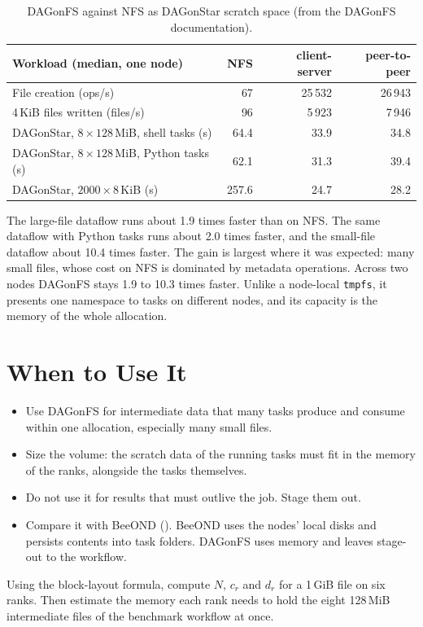 \begin{table}[h]
\centering
\begin{tabular}{@{}lrrr@{}}
\toprule
Workload (median, one node) & NFS & client-server & peer-to-peer \\
\midrule
File creation (ops/s) & 67 & 25\,532 & 26\,943 \\
4\,KiB files written (files/s) & 96 & 5\,923 & 7\,946 \\
DAGonStar, $8\times128$\,MiB, shell tasks (s) & 64.4 & 33.9 & 34.8 \\
DAGonStar, $8\times128$\,MiB, Python tasks (s) & 62.1 & 31.3 & 39.4 \\
DAGonStar, $2000\times8$\,KiB (s) & 257.6 & 24.7 & 28.2 \\
\bottomrule
\end{tabular}
\caption{DAGonFS against NFS as DAGonStar scratch space (from the DAGonFS
documentation).}
\label{tab:dagonfs-perf}
\end{table}

The large-file dataflow runs about 1.9 times faster than on NFS. The same
dataflow with Python tasks runs about 2.0 times faster, and the small-file
dataflow about 10.4 times faster. The gain is largest where it was expected:
many small files, whose cost on NFS is dominated by metadata operations.
Across two nodes DAGonFS stays 1.9 to 10.3 times faster. Unlike a node-local
\texttt{tmpfs}, it presents one namespace to tasks on different nodes, and
its capacity is the memory of the whole allocation.

\section{When to Use It}

\begin{itemize}[leftmargin=1.4em]
  \item Use DAGonFS for intermediate data that many tasks produce and
    consume within one allocation, especially many small files.
  \item Size the volume: the scratch data of the running tasks must fit in
    the memory of the ranks, alongside the tasks themselves.
  \item Do not use it for results that must outlive the job. Stage them out.
  \item Compare it with BeeOND (). BeeOND uses the nodes'
    local disks and persists contents into task folders. DAGonFS uses memory
    and leaves stage-out to the workflow.
\end{itemize}

\begin{exercise}
Using the block-layout formula, compute $N$, $c_r$ and $d_r$ for a 1\,GiB file
on six ranks. Then estimate the memory each rank needs to hold the eight
128\,MiB intermediate files of the benchmark workflow at once.
\end{exercise}
